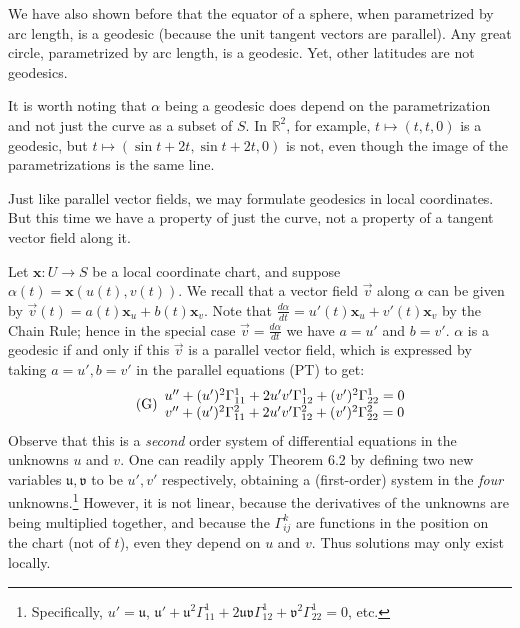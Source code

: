 \documentclass[leqno]{book}
\begin{document}
We have also shown before that the equator of a sphere, when parametrized by arc length, is a geodesic (because the unit tangent vectors are parallel).  Any great circle, parametrized by arc length, is a geodesic.  Yet, other latitudes are not geodesics.

It is worth noting that $\alpha$ being a geodesic does depend on the parametrization and not just the curve as a subset of $S$.  In $\mathbb R^2$, for example, $t\mapsto(t,t,0)$ is a geodesic, but $t\mapsto(\sin t+2t,\sin t+2t,0)$ is not, even though the image of the parametrizations is the same line.

Just like parallel vector fields, we may formulate geodesics in local coordinates.  But this time we have a property of just the curve, not a property of a tangent vector field along it.

Let $\mathbf x:U\to S$ be a local coordinate chart, and suppose $\alpha(t)=\mathbf x(u(t),v(t))$.  We recall that a vector field $\vec v$ along $\alpha$ can be given by $\vec v(t)=a(t)\mathbf x_u+b(t)\mathbf x_v$.  Note that $\frac{d\alpha}{dt}=u'(t)\mathbf x_u+v'(t)\mathbf x_v$ by the Chain Rule; hence in the special case $\vec v=\frac{d\alpha}{dt}$ we have $a=u'$ and $b=v'$.  $\alpha$ is a geodesic if and only if this $\vec v$ is a parallel vector field, which is expressed by taking $a=u',b=v'$ in the parallel equations (PT) to get:
\begin{equation}\tag{G}\begin{array}{c l}u''+(u')^2\Gamma_{11}^1+2u'v'\Gamma_{12}^1+(v')^2\Gamma_{22}^1=0\\v''+(u')^2\Gamma_{11}^2+2u'v'\Gamma_{12}^2+(v')^2\Gamma_{22}^2=0\end{array}\end{equation}
Observe that this is a \emph{second} order system of differential equations in the unknowns $u$ and $v$.  One can readily apply Theorem 6.2 by defining two new variables $\mathfrak u,\mathfrak v$ to be $u',v'$ respectively, obtaining a (first-order) system in the \emph{four} unknowns.\footnote{Specifically, $u'=\mathfrak u$, $\mathfrak u'+\mathfrak u^2\Gamma_{11}^1+2\mathfrak u\mathfrak v\Gamma_{12}^1+\mathfrak v^2\Gamma_{22}^1=0$, etc.}  However, it is not linear, because the derivatives of the unknowns are being multiplied together, and because the $\Gamma_{ij}^k$ are functions in the position on the chart (not of $t$), even they depend on $u$ and $v$.  Thus solutions may only exist locally. %
\end{document}
